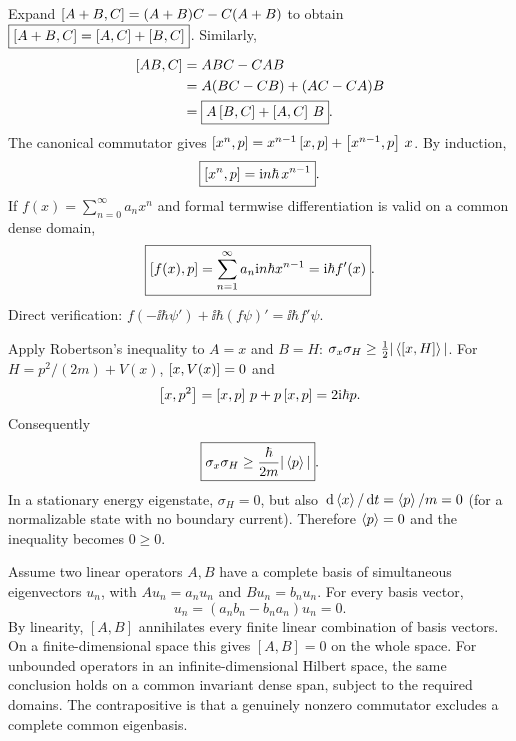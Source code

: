 Expand $\left[A+B,C\right]=(A+B)C-C(A+B)$ to obtain
$\boxed{\left[A+B,C\right]=\left[A,C\right]+\left[B,C\right]}$.
Similarly,
\begin{align}
\left[AB,C\right]
&=ABC-CAB\\
&=A(BC-CB)+(AC-CA)B\\
&=\boxed{A\left[B,C\right]+\left[A,C\right]\,B}.
\end{align}
The canonical commutator gives
$\left[x^n,p\right]=
x^{n-1}\left[x,p\right]+
\left[x^{n-1},p\right]\,x$.
By induction,
\begin{equation}
\boxed{\left[x^n,p\right]=\mathrm{i} n\hbar\,x^{n-1}}.
\end{equation}
If $f(x)=\sum_{n=0}^\infty a_nx^n$
and formal termwise differentiation is valid
on a common dense domain,
\begin{equation}
\boxed{\left[f(x),p\right]=
\sum_{n=1}^\infty a_n\mathrm{i} n\hbar x^{n-1}
=\mathrm{i}\hbar f'(x)}.
\end{equation}
Direct verification:
$f(-\ii\hbar\psi')+
\ii\hbar(f\psi)'=\ii\hbar f'\psi$.

Apply Robertson's inequality to $A=x$ and $B=H$:
$\sigma_x\sigma_H\ge
\frac12|\left\langle\left[x,H\right]\right\rangle|$.
For $H=p^2/(2m)+V(x)$,
$\left[x,V(x)\right]=0$ and
\begin{equation}
\left[x,p^2\right]=\left[x,p\right]\,p+
p\left[x,p\right]=2\mathrm{i}\hbar p.
\end{equation}
Consequently
\begin{equation}
\boxed{\sigma_x\sigma_H\ge
\frac{\hbar}{2m}|\left\langle p\right\rangle|}.
\end{equation}
In a stationary energy eigenstate,
$\sigma_H=0$, but also
$\,\mathrm{d}\left\langle x\right\rangle/\,\mathrm{d} t=\left\langle p\right\rangle/m=0$
(for a normalizable state with no boundary
current). Therefore $\left\langle p\right\rangle=0$
and the inequality becomes $0\ge0$.

Assume two linear operators $A,B$ have
a complete basis of simultaneous eigenvectors
$u_n$, with $Au_n=a_nu_n$ and $Bu_n=b_nu_n$.
For every basis vector,
\begin{equation}
[A,B]u_n=(a_nb_n-b_na_n)u_n=0.
\end{equation}
By linearity, $[A,B]$ annihilates every
finite linear combination of basis vectors.
On a finite-dimensional space this gives
$[A,B]=0$ on the whole space. For
unbounded operators in an infinite-dimensional
Hilbert space, the same conclusion holds
on a common invariant dense span, subject
to the required domains. The contrapositive is
that a genuinely nonzero commutator excludes
a complete common eigenbasis.

